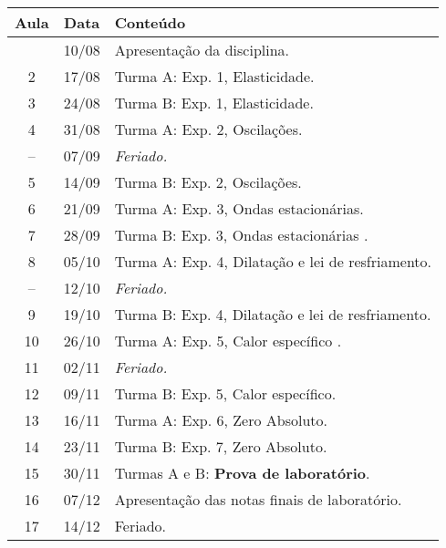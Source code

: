 \begin{center}
\begin{longtable}{ccp{70mm}}
\toprule
Aula & Data & Conteúdo \\
\midrule
\endhead
\bottomrule
\endfoot
 1 & 10/08 & Apresentação da disciplina. \\
 2 & 17/08 & Turma A: Exp. 1, Elasticidade. \\
 3 & 24/08 & Turma B: Exp. 1, Elasticidade. \\
 4 & 31/08 & Turma A: Exp. 2, Oscilações. \\
-- & 07/09 & \emph{Feriado.} \\
 5 & 14/09 & Turma B: Exp. 2, Oscilações. \\
 6 & 21/09 & Turma A: Exp. 3, Ondas estacionárias. \\
 7 & 28/09 & Turma B: Exp. 3, Ondas estacionárias . \\
 8 & 05/10 & Turma A: Exp. 4, Dilatação e lei de resfriamento. \\
-- & 12/10 & \emph{Feriado.} \\
 9 & 19/10 & Turma B: Exp. 4, Dilatação e lei de resfriamento. \\
10 & 26/10 & Turma A: Exp. 5, Calor específico . \\
11 & 02/11 & \emph{Feriado.} \\
12 & 09/11 & Turma B: Exp. 5, Calor específico. \\ 
13 & 16/11 & Turma A: Exp. 6, Zero Absoluto. \\
14 & 23/11 & Turma B: Exp. 7, Zero Absoluto. \\
15 & 30/11 & Turmas A e B: \textbf{Prova de laboratório}. \\
16 & 07/12 & Apresentação das notas finais de laboratório. \\
17 & 14/12 & Feriado. \\
\end{longtable}
\end{center}

\clearpage



